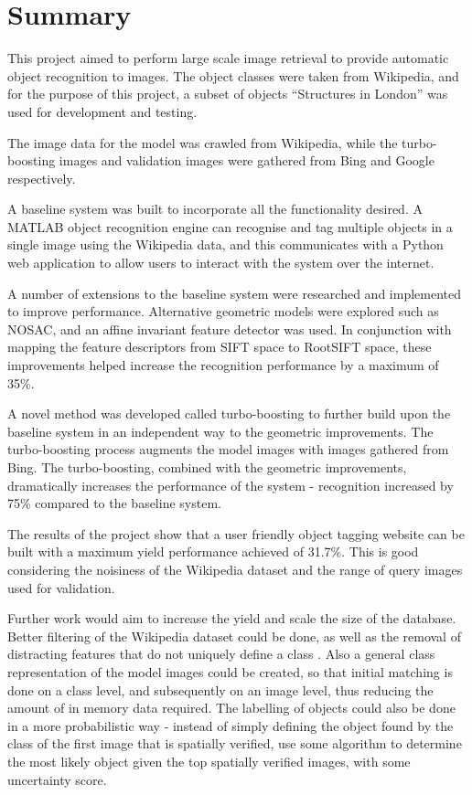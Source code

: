 \documentclass[11pt, onecolumn, a4paper, final]{report} %
\begin{document}
\chapter{Summary}
This project aimed to perform large scale image retrieval to provide automatic object recognition to images. The object classes were taken from Wikipedia, and for the purpose of this project, a subset of objects ``Structures in London'' was used for development and testing.

The image data for the model was crawled from Wikipedia, while the turbo-boosting images and validation images were gathered from Bing and Google respectively.  

A  baseline system was built to incorporate all the functionality desired. A MATLAB object recognition engine can recognise and tag multiple objects in a single image using the Wikipedia data, and this communicates with a Python web application to allow users to interact with the system over the internet.

A number of extensions to the baseline system were researched and implemented to improve performance. Alternative geometric models were explored such as NOSAC, and an affine invariant feature detector was used. In conjunction with mapping the feature descriptors from SIFT space to RootSIFT space, these improvements helped increase the recognition performance by a maximum of 35\%.

A novel method was developed called turbo-boosting to further build upon the baseline system in an independent way to the geometric improvements. The turbo-boosting process augments the model images with images gathered from Bing. The turbo-boosting, combined with the geometric improvements, dramatically increases the performance of the system - recognition increased by 75\% compared to the baseline system.

The results of the project show that a user friendly object tagging website can be built with a maximum yield performance achieved of 31.7\%. This is good considering the noisiness of the Wikipedia dataset and the range of query images used for validation.

Further work would aim to increase the yield and scale the size of the database. Better filtering of the Wikipedia dataset could be done, as well as the removal of distracting features that do not uniquely define a class \cite{turcot09}. Also a general class representation of the model images could be created, so that initial matching is done on a class level, and subsequently on an image level, thus reducing the amount of in memory data required. The labelling of objects could also be done in a more probabilistic way - instead of simply defining the object found by the class of the first image that is spatially verified, use some algorithm to determine the most likely object given the top spatially verified images, with some uncertainty score.
\end{document}
